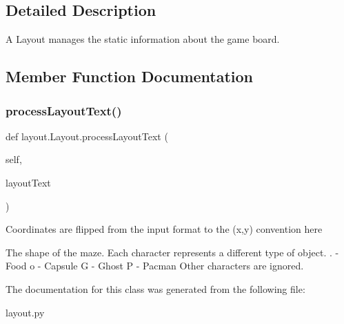 \subsection{Detailed Description}
\begin{DoxyVerb}A Layout manages the static information about the game board.
\end{DoxyVerb}
 

\subsection{Member Function Documentation}
\mbox{\label{classlayout_1_1_layout_a4e7437180be84096a4352067707318eb}} 
\subsubsection{\texorpdfstring{process\+Layout\+Text()}{processLayoutText()}}
{\footnotesize\ttfamily def layout.\+Layout.\+process\+Layout\+Text (\begin{DoxyParamCaption}\item[{}]{self,  }\item[{}]{layout\+Text }\end{DoxyParamCaption})}

\begin{DoxyVerb}Coordinates are flipped from the input format to the (x,y) convention here

The shape of the maze.  Each character  
represents a different type of object.   
 . - Food
 o - Capsule
 G - Ghost
 P - Pacman
Other characters are ignored.
\end{DoxyVerb}
 

The documentation for this class was generated from the following file\+:\begin{DoxyCompactItemize}
\item 
layout.\+py\end{DoxyCompactItemize}
